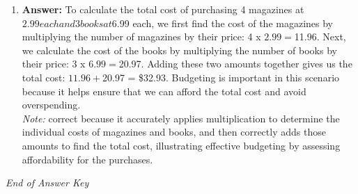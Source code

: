 \documentclass[12pt]{article}
\begin{document}
\begin{enumerate}[label=\arabic*.]
\item \textbf{Answer:} To calculate the total cost of purchasing 4 magazines at $2.99 each and 3 books at $6.99 each, we first find the cost of the magazines by multiplying the number of magazines by their price: 4 x $2.99 = $11.96. Next, we calculate the cost of the books by multiplying the number of books by their price: 3 x $6.99 = $20.97. Adding these two amounts together gives us the total cost: $11.96 + $20.97 = \$32.93. Budgeting is important in this scenario because it helps ensure that we can afford the total cost and avoid overspending.
\\ \textit{Note:} correct because it accurately applies multiplication to determine the individual costs of magazines and books, and then correctly adds those amounts to find the total cost, illustrating effective budgeting by assessing affordability for the purchases.
\end{enumerate}

\vfill
\noindent\textit{End of Answer Key}
\end{document}
